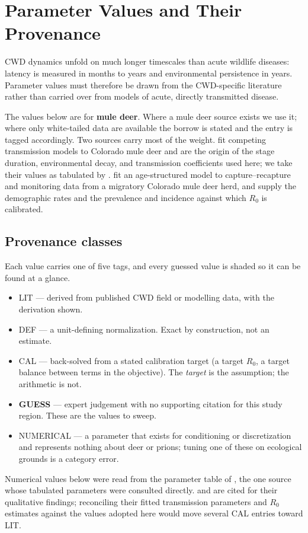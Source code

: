\documentclass[11pt]{article}
\newcommand{\tagLIT}{{\footnotesize\textsf{\textcolor{green!40!black}{LIT}}}}
\newcommand{\tagDEF}{{\footnotesize\textsf{\textcolor{blue!60!black}{DEF}}}}
\newcommand{\tagCAL}{{\footnotesize\textsf{\textcolor{orange!75!black}{CAL}}}}
\newcommand{\tagGUESS}{{\footnotesize\textsf{\textbf{\textcolor{red!70!black}{GUESS}}}}}
\newcommand{\tagNUM}{{\footnotesize\textsf{\textcolor{purple!70!black}{NUMERICAL}}}}
\begin{document}
\section{Parameter Values and Their Provenance}
\label{sec:params}

CWD dynamics unfold on much longer timescales than acute wildlife diseases: latency is measured in months to years and environmental persistence in years. Parameter values must therefore be drawn from the CWD-specific literature rather than carried over from models of acute, directly transmitted disease.

The values below are for \textbf{mule deer}. Where a mule deer source exists we use it; where only white-tailed data are available the borrow is stated and the entry is tagged accordingly. Two sources carry most of the weight. \citet{Miller2006} fit competing transmission models to Colorado mule deer and are the origin of the stage duration, environmental decay, and transmission coefficients used here; we take their values as tabulated by \citet{FitzGerald2025}. \citet{Geremia2015} fit an age-structured model to capture--recapture and monitoring data from a migratory Colorado mule deer herd, and supply the demographic rates and the prevalence and incidence against which $R_0$ is calibrated.

\subsection{Provenance classes}

Each value carries one of five tags, and every guessed value is shaded so it can be found at a glance.
\begin{itemize}
\item \tagLIT{} --- derived from published CWD field or modelling data, with the derivation shown.
\item \tagDEF{} --- a unit-defining normalization. Exact by construction, not an estimate.
\item \tagCAL{} --- back-solved from a stated calibration target (a target $R_0$, a target balance between terms in the objective). The \emph{target} is the assumption; the arithmetic is not.
\item \tagGUESS{} --- expert judgement with no supporting citation for this study region. These are the values to sweep.
\item \tagNUM{} --- a parameter that exists for conditioning or discretization and represents nothing about deer or prions; tuning one of these on ecological grounds is a category error.
\end{itemize}
Numerical values below were read from the parameter table of \citet{Almberg2011}, the one source whose tabulated parameters were consulted directly. \citet{Miller2006} and \citet{Wasserberg2009} are cited for their qualitative findings; reconciling their fitted transmission parameters and $R_0$ estimates against the values adopted here would move several \tagCAL{} entries toward \tagLIT{}.
\end{document}

